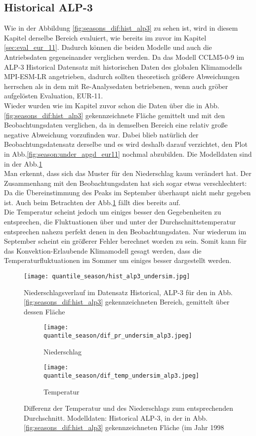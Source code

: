 \subsection{Historical ALP-3}
Wie in der Abbildung \ref{fig:seasons_dif:hist_alp3} zu sehen ist, wird in diesem Kapitel derselbe Bereich evaluiert, wie bereits im zuvor im Kapitel \ref{sec:eval_eur_11}. Dadurch können die beiden Modelle und auch die Antriebsdaten gegeneinander verglichen werden. Da das Modell CCLM5-0-9 im ALP-3 Historical Datensatz mit historischen Daten des globalen Klimamodells MPI-ESM-LR angetrieben, dadurch sollten theoretisch größere Abweichungen herrschen als in dem mit Re-Analysedaten betriebenen, wenn auch gröber aufgelösten Evaluation, EUR-11.\\
Wieder wurden wie im Kapitel zuvor schon die Daten über die in Abb.\ref{fig:seasons_dif:hist_alp3} gekennzeichnete Fläche gemittelt und mit den Beobachtungsdaten verglichen, da in demselben Bereich eine relativ große negative Abweichung vorzufinden war. Dabei blieb natürlich der Beobachtungsdatensatz derselbe und es wird deshalb darauf verzichtet, den Plot in Abb.\ref{fig:season:under_apgd_eur11} nochmal abzubilden. Die Modelldaten sind in der Abb.\ref{fig:season:under_hist_alp3}\\
Man erkennt, dass sich das Muster für den Niederschlag kaum verändert hat. Der Zusammenhang mit den Beobachtungsdaten hat sich sogar etwas verschlechtert: Da die Übereinstimmung des Peaks im September überhaupt nicht mehr gegeben ist. Auch beim Betrachten der Abb.\ref{fig:season:under_hist_alp3} fällt dies bereits auf.\\
Die Temperatur scheint jedoch um einiges besser den Gegebenheiten zu entsprechen, die Fluktuationen über und unter der Durchschnittstemperatur entsprechen nahezu perfekt denen in den Beobachtungsdaten. Nur wiederum im September scheint ein größerer Fehler berechnet worden zu sein. Somit kann für das Konvektion-Erlaubende Klimamodell gesagt werden, dass die Temperaturfluktuationen im Sommer um einiges besser dargestellt werden.
\begin{figure}[h]
	\texttt{[image: quantile\_season/hist\_alp3\_undersim.jpg]}
	\caption{Niederschlagsverlauf im Datensatz Historical, ALP-3 für den in Abb.\ref{fig:seasons_dif:hist_alp3} gekennzeichneten Bereich, gemittelt über dessen Fläche}
	\label{fig:season:under_hist_alp3}
\end{figure}
\begin{figure}[h]
	\begin{subfigure}{0.49\textwidth}
		\texttt{[image: quantile\_season/dif\_pr\_undersim\_alp3.jpeg]}
		\caption{Niederschlag}
	\end{subfigure}
	\begin{subfigure}{0.49\textwidth}
		\texttt{[image: quantile\_season/dif\_temp\_undersim\_alp3.jpeg]}
		\caption{Temperatur}
	\end{subfigure}
	\caption{Differenz der Temperatur und des Niederschlags zum entsprechenden Durchschnitt. Modelldaten: Historical ALP-3, in der in Abb.\ref{fig:seasons_dif:hist_alp3} gekennzeichneten Fläche (im Jahr 1998}
	\label{fig:seasons:mean_alp3}
\end{figure}
\newpage
